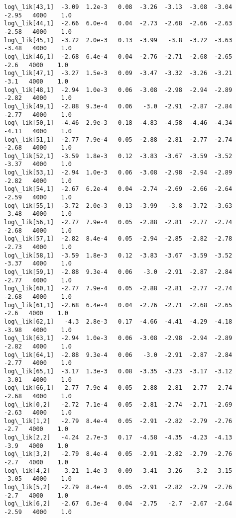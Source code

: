 \documentclass[11pt]{article}
\begin{document}
\begin{Verbatim}[commandchars=\\\{\}]
log\_lik[43,1]  -3.09  1.2e-3   0.08  -3.26  -3.13  -3.08  -3.04  -2.95   4000    1.0
log\_lik[44,1]  -2.66  6.0e-4   0.04  -2.73  -2.68  -2.66  -2.63  -2.58   4000    1.0
log\_lik[45,1]  -3.72  2.0e-3   0.13  -3.99   -3.8  -3.72  -3.63  -3.48   4000    1.0
log\_lik[46,1]  -2.68  6.4e-4   0.04  -2.76  -2.71  -2.68  -2.65   -2.6   4000    1.0
log\_lik[47,1]  -3.27  1.5e-3   0.09  -3.47  -3.32  -3.26  -3.21   -3.1   4000    1.0
log\_lik[48,1]  -2.94  1.0e-3   0.06  -3.08  -2.98  -2.94  -2.89  -2.82   4000    1.0
log\_lik[49,1]  -2.88  9.3e-4   0.06   -3.0  -2.91  -2.87  -2.84  -2.77   4000    1.0
log\_lik[50,1]  -4.46  2.9e-3   0.18  -4.83  -4.58  -4.46  -4.34  -4.11   4000    1.0
log\_lik[51,1]  -2.77  7.9e-4   0.05  -2.88  -2.81  -2.77  -2.74  -2.68   4000    1.0
log\_lik[52,1]  -3.59  1.8e-3   0.12  -3.83  -3.67  -3.59  -3.52  -3.37   4000    1.0
log\_lik[53,1]  -2.94  1.0e-3   0.06  -3.08  -2.98  -2.94  -2.89  -2.82   4000    1.0
log\_lik[54,1]  -2.67  6.2e-4   0.04  -2.74  -2.69  -2.66  -2.64  -2.59   4000    1.0
log\_lik[55,1]  -3.72  2.0e-3   0.13  -3.99   -3.8  -3.72  -3.63  -3.48   4000    1.0
log\_lik[56,1]  -2.77  7.9e-4   0.05  -2.88  -2.81  -2.77  -2.74  -2.68   4000    1.0
log\_lik[57,1]  -2.82  8.4e-4   0.05  -2.94  -2.85  -2.82  -2.78  -2.73   4000    1.0
log\_lik[58,1]  -3.59  1.8e-3   0.12  -3.83  -3.67  -3.59  -3.52  -3.37   4000    1.0
log\_lik[59,1]  -2.88  9.3e-4   0.06   -3.0  -2.91  -2.87  -2.84  -2.77   4000    1.0
log\_lik[60,1]  -2.77  7.9e-4   0.05  -2.88  -2.81  -2.77  -2.74  -2.68   4000    1.0
log\_lik[61,1]  -2.68  6.4e-4   0.04  -2.76  -2.71  -2.68  -2.65   -2.6   4000    1.0
log\_lik[62,1]   -4.3  2.8e-3   0.17  -4.66  -4.41  -4.29  -4.18  -3.98   4000    1.0
log\_lik[63,1]  -2.94  1.0e-3   0.06  -3.08  -2.98  -2.94  -2.89  -2.82   4000    1.0
log\_lik[64,1]  -2.88  9.3e-4   0.06   -3.0  -2.91  -2.87  -2.84  -2.77   4000    1.0
log\_lik[65,1]  -3.17  1.3e-3   0.08  -3.35  -3.23  -3.17  -3.12  -3.01   4000    1.0
log\_lik[66,1]  -2.77  7.9e-4   0.05  -2.88  -2.81  -2.77  -2.74  -2.68   4000    1.0
log\_lik[0,2]   -2.72  7.1e-4   0.05  -2.81  -2.74  -2.71  -2.69  -2.63   4000    1.0
log\_lik[1,2]   -2.79  8.4e-4   0.05  -2.91  -2.82  -2.79  -2.76   -2.7   4000    1.0
log\_lik[2,2]   -4.24  2.7e-3   0.17  -4.58  -4.35  -4.23  -4.13   -3.9   4000    1.0
log\_lik[3,2]   -2.79  8.4e-4   0.05  -2.91  -2.82  -2.79  -2.76   -2.7   4000    1.0
log\_lik[4,2]   -3.21  1.4e-3   0.09  -3.41  -3.26   -3.2  -3.15  -3.05   4000    1.0
log\_lik[5,2]   -2.79  8.4e-4   0.05  -2.91  -2.82  -2.79  -2.76   -2.7   4000    1.0
log\_lik[6,2]   -2.67  6.3e-4   0.04  -2.75   -2.7  -2.67  -2.64  -2.59   4000    1.0

\end{Verbatim}
\end{document}
